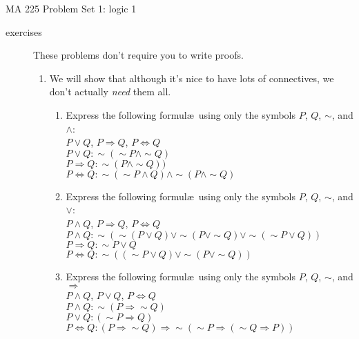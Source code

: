 \documentclass{letter}
\begin{document}
\pagestyle{empty}

{\Large MA 225 Problem Set 1: logic 1}\\
\begin{description}
\item[exercises] These problems don't require you to write proofs.
\begin{enumerate}
	\item We will show that although it's nice to have lots of connectives, we don't actually {\em need} them all.
			\begin{enumerate}\itemsep=1.25mm
				\item Express the following formul\ae\  using only the symbols $P$, $Q$, $\sim$, and $\wedge$: \\
				$P\vee Q$, $P\Rightarrow Q$, $P\Leftrightarrow Q$ \\
                               $P \vee Q: \sim (\sim P \wedge \sim Q)$ \\
                                  $P \Rightarrow Q: \sim (P \wedge \sim Q))$ \\
                                  $P \Leftrightarrow Q: \sim(\sim P \wedge Q) \wedge \sim (P \wedge \sim Q)$
				\item Express the following formul\ae\  using only the symbols $P$, $Q$, $\sim$, and $\vee$:\\
					$P \wedge Q$, $P\Rightarrow Q$, $P\Leftrightarrow Q$ \\
                                  $P \wedge Q: \sim ( \sim (P \vee Q) \vee \sim ( P \vee \sim Q) \vee \sim ( \sim P \vee Q))$ \\
                                  $P \Rightarrow Q: \sim P \vee Q $ \\
                                  $P \Leftrightarrow Q: \sim ((\sim P \vee Q) \vee \sim (P \vee \sim Q))$ \\
				\item Express the following formul\ae\ using only the symbols $P$, $Q$, $\sim$, and $\Rightarrow$\\
				$P\wedge Q$, $P\vee Q$, $P\Leftrightarrow Q$ \\
                                  $P\wedge Q: \sim (P \Rightarrow \sim Q)$ \\
                                  $P \vee Q: (\sim P \Rightarrow  Q)$ \\
                                  $P \Leftrightarrow Q: (P \Rightarrow \sim Q) \Rightarrow \sim (\sim P \Rightarrow  (\sim Q \Rightarrow P)) $ \\
                                

\end{enumerate}
\end{enumerate}
\end{description}
\end{document}
